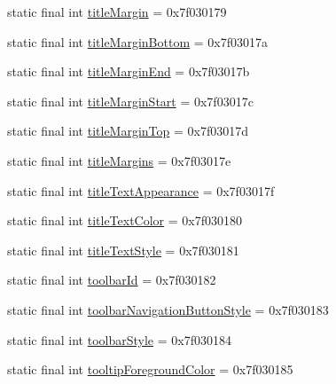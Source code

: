 \begin{DoxyCompactItemize}
\item 
static final int \mbox{\hyperlink{classandroid_1_1support_1_1design_1_1R_1_1attr_ab556bea2b89951d8a589842449ab2194}{title\+Margin}} = 0x7f030179
\item 
static final int \mbox{\hyperlink{classandroid_1_1support_1_1design_1_1R_1_1attr_a87245c54e5e4a03a199ea283004b986b}{title\+Margin\+Bottom}} = 0x7f03017a
\item 
static final int \mbox{\hyperlink{classandroid_1_1support_1_1design_1_1R_1_1attr_ae7c626cff9780f4c6e48a3a57fe5df97}{title\+Margin\+End}} = 0x7f03017b
\item 
static final int \mbox{\hyperlink{classandroid_1_1support_1_1design_1_1R_1_1attr_a22d72ed903994a5a154f4d1d51d7d548}{title\+Margin\+Start}} = 0x7f03017c
\item 
static final int \mbox{\hyperlink{classandroid_1_1support_1_1design_1_1R_1_1attr_ada6994d4f765d374fc7ecf540878f62c}{title\+Margin\+Top}} = 0x7f03017d
\item 
static final int \mbox{\hyperlink{classandroid_1_1support_1_1design_1_1R_1_1attr_ac317289ca5428299e0879f393c2097f1}{title\+Margins}} = 0x7f03017e
\item 
static final int \mbox{\hyperlink{classandroid_1_1support_1_1design_1_1R_1_1attr_aa54cad2447fcae6c425d997f842d547e}{title\+Text\+Appearance}} = 0x7f03017f
\item 
static final int \mbox{\hyperlink{classandroid_1_1support_1_1design_1_1R_1_1attr_a61ab4e11b7ddf32429aa917a4436eb81}{title\+Text\+Color}} = 0x7f030180
\item 
static final int \mbox{\hyperlink{classandroid_1_1support_1_1design_1_1R_1_1attr_a88a90fd7bafbbc05004a0a6e0420f6b9}{title\+Text\+Style}} = 0x7f030181
\item 
static final int \mbox{\hyperlink{classandroid_1_1support_1_1design_1_1R_1_1attr_ae9f565520d2e78480db1dae46fccb81b}{toolbar\+Id}} = 0x7f030182
\item 
static final int \mbox{\hyperlink{classandroid_1_1support_1_1design_1_1R_1_1attr_a9733b7b45c6e2fdfb80f9271d546762a}{toolbar\+Navigation\+Button\+Style}} = 0x7f030183
\item 
static final int \mbox{\hyperlink{classandroid_1_1support_1_1design_1_1R_1_1attr_af57093ce0a51175955ed5221ab7b8067}{toolbar\+Style}} = 0x7f030184
\item 
static final int \mbox{\hyperlink{classandroid_1_1support_1_1design_1_1R_1_1attr_ae847265357dd1bea6c55b9afd0710c84}{tooltip\+Foreground\+Color}} = 0x7f030185
\item 

\end{DoxyCompactItemize}
